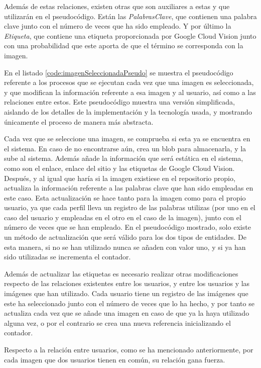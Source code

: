 Además de estas relaciones, existen otras que son auxiliares a estas y que utilizarán en el pseudocódigo. Están las \textit{PalabrasClave}, que contienen una palabra clave junto con el número de veces que ha sido empleado. Y por último la \textit{Etiqueta}, que contiene una etiqueta proporcionada por Google Cloud Vision junto con una probabilidad que este aporta de que el término se corresponda con la imagen. 

En el listado \ref{code:imagenSeleccionadaPseudo} se muestra el pseudocódigo referente a los procesos que se ejecutan cada vez que una imagen es seleccionada, y que modifican la información referente a esa imagen y al usuario, así como a las relaciones entre estos. Este pseudocódigo muestra una versión simplificada, aislando de los detalles de la implementación y la tecnología usada, y mostrando únicamente el proceso de manera más abstracta.

Cada vez que se seleccione una imagen, se comprueba si esta ya se encuentra en el sistema. En caso de no encontrarse aún, crea un blob para almacenarla, y la sube al sistema. Además añade la información que será estática en el sistema, como son el enlace, enlace del sitio y las etiquetas de Google Cloud Vision. Después, y al igual que haría si la imagen existiese en el repositorio propio, actualiza la información referente a las palabras clave que han sido empleadas en este caso. Esta actualización se hace tanto para la imagen como para el propio usuario, ya que cada perfil lleva un registro de las palabras utilizas (por uno en el caso del usuario y empleadas en el otro en el caso de la imagen), junto con el número de veces que se han empleado. En el pseudocódigo mostrado, solo existe un método de actualización que será válido para los dos tipos de entidades. De esta manera, si no se han utilizado nunca se añaden con valor uno, y si ya han sido utilizadas se incrementa el contador.

Además de actualizar las etiquetas es necesario realizar otras modificaciones respecto de las relaciones existentes entre los usuarios, y entre los usuarios y las imágenes que han utilizado. Cada usuario tiene un registro de las imágenes que este ha seleccionado junto con el número de veces que lo ha hecho, y por tanto se actualiza cada vez que se añade una imagen en caso de que ya la haya utilizado alguna vez, o por el contrario se crea una nueva referencia inicializando el contador.

Respecto a la relación entre usuarios, como se ha mencionado anteriormente, por cada imagen que dos usuarios tienen en común, su relación gana fuerza. 


